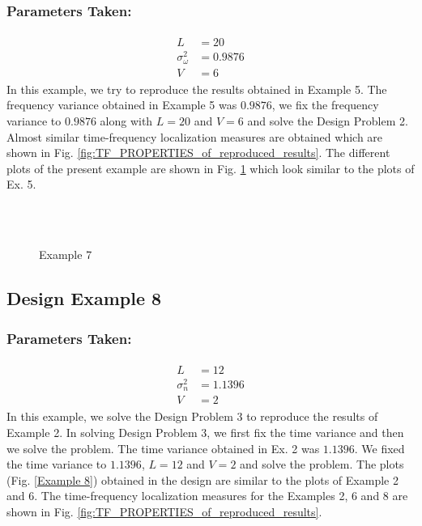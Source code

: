 \subsubsection{Parameters Taken:}
\begin{eqnarray*}
\begin{aligned}
L &= 20\\
\sigma_\omega^2 &= 0.9876\\
V &= 6
\end{aligned}
\end{eqnarray*}
In this example, we try to reproduce the results obtained in Example 5. The frequency variance obtained in Example 5 was $0.9876$, we fix the frequency variance to $0.9876$ along with $L=20$ and $V=6$ and solve the Design Problem 2. Almost similar time-frequency localization measures are obtained which are shown in Fig. \ref{fig:TF_PROPERTIES_of_reproduced_results}. The different plots of the present example are shown in Fig. \ref{Example 7} which look similar to the plots of Ex. 5. 
\begin{figure*}
\centering
{}\\
\\
%
\caption{Example 7}
\label{Example 7}
\end{figure*}

\subsection{Design Example 8}
\label{Design Example 8}
\subsubsection{Parameters Taken:}
\begin{eqnarray*}
\begin{aligned}
L &= 12\\
\sigma_n^2 &= 1.1396\\
V &= 2
\end{aligned}
\end{eqnarray*}
In this example, we solve the Design Problem 3 to reproduce the results of Example 2. In solving Design Problem 3, we first fix the time variance and then we solve the problem. The time variance obtained in Ex. 2 was $1.1396$. We fixed the time variance to $1.1396$, $L=12$ and $V=2$ and solve the problem. The plots (Fig. \ref{Example 8}) obtained in the design are similar to the plots of Example 2 and 6. The time-frequency localization measures for the Examples 2, 6 and 8 are shown in Fig. \ref{fig:TF_PROPERTIES_of_reproduced_results}.

